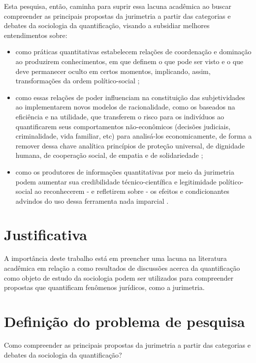 Esta pesquisa, então, caminha para suprir essa lacuna acadêmica ao buscar compreender as principais propostas da jurimetria a partir das categorias e debates da sociologia da quantificação, visando a subsidiar melhores entendimentos sobre:
\begin{itemize}
	\item como práticas quantitativas estabelecem relações de coordenação e dominação ao produzirem conhecimentos, em que definem o que pode ser visto e o que deve permanecer oculto em certos momentos, implicando, assim, transformações da ordem político-social \cite{camargo2021estudos} \cite{mennicken2019s};
	\item como essas relações de poder influenciam na constituição das subjetividades ao implementarem novos modelos de racionalidade, como os baseados na eficiência e na utilidade, que transferem o risco para os indivíduos ao quantificarem seus comportamentos não-econômicos (decisões judiciais, criminalidade, vida familiar, etc) para analisá-los economicamente, de forma a remover dessa chave analítica princípios de proteção universal, de dignidade humana, de cooperação social, de empatia e de solidariedade \cite{camargo2021estudos} \cite{camargo2021quantificaccao};
	\item como os produtores de informações quantitativas por meio da jurimetria podem aumentar sua credibilidade técnico-científica e legitimidade político-social ao reconhecerem - e refletirem sobre - os efeitos e condicionantes advindos do uso dessa ferramenta nada imparcial \cite{camargo2021quantificaccao}.
\end{itemize}


\section{Justificativa}
\label{sec_motivacao}

A importância deste trabalho está em preencher uma lacuna na literatura acadêmica em relação a como resultados de discussões acerca da quantificação como objeto de estudo da sociologia podem ser utilizados para compreender propostas que quantificam fenômenos jurídicos, como a jurimetria.

\section{Definição do problema de pesquisa}
\label{sec_definicao_problema_pesquisa}

Como compreender as principais propostas da jurimetria a partir das categorias e debates da sociologia da quantificação?

